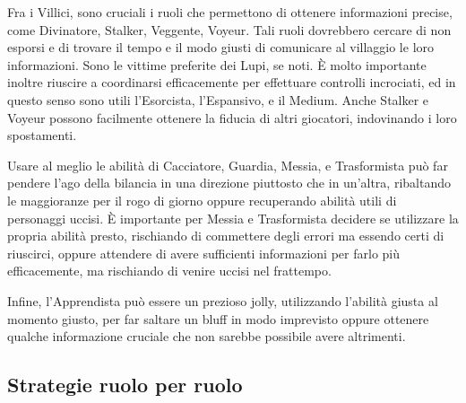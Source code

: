 \documentclass[a4paper,10pt]{article}
\begin{document}
Fra i Villici, sono cruciali i ruoli che permettono di ottenere informazioni precise, come Divinatore, Stalker, Veggente, Voyeur. Tali ruoli dovrebbero cercare di non esporsi e di trovare il tempo e il modo giusti di comunicare al villaggio le loro informazioni. Sono le vittime preferite dei Lupi, se noti. È molto importante inoltre riuscire a coordinarsi efficacemente per effettuare controlli incrociati, ed in questo senso sono utili l'Esorcista, l'Espansivo, e il Medium. Anche Stalker e Voyeur possono facilmente ottenere la fiducia di altri giocatori, indovinando i loro spostamenti.

Usare al meglio le abilità di Cacciatore, Guardia, Messia, e Trasformista può far pendere l'ago della bilancia in una direzione piuttosto che in un'altra, ribaltando le maggioranze per il rogo di giorno oppure recuperando abilità utili di personaggi uccisi. È importante per Messia e Trasformista decidere se utilizzare la propria abilità presto, rischiando di commettere degli errori ma essendo certi di riuscirci, oppure attendere di avere sufficienti informazioni per farlo più efficacemente, ma rischiando di venire uccisi nel frattempo.

Infine, l'Apprendista può essere un prezioso jolly, utilizzando l'abilità giusta al momento giusto, per far saltare un bluff in modo imprevisto oppure ottenere qualche informazione cruciale che non sarebbe possibile avere altrimenti. 

\subsection{Strategie ruolo per ruolo}
\end{document}
